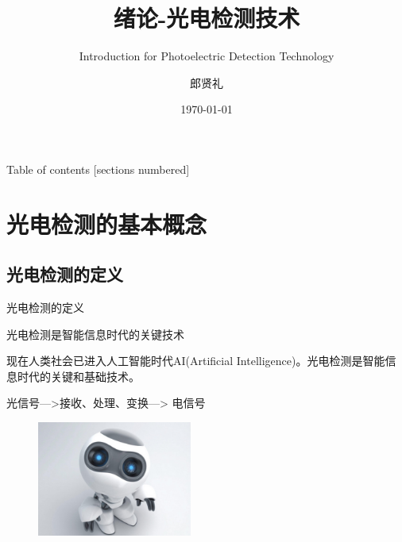 \documentclass[10pt]{beamer}
\title{绪论-光电检测技术}%
\subtitle{Introduction for Photoelectric Detection Technology}
\date{\today}
\author{郎贤礼}
\institute{仪器学院  HFUT}
\begin{document}
\maketitle

\begin{frame}{Table of contents}
  [sections numbered]
  \tableofcontents[hideallsubsections]
\end{frame}

\section{光电检测的基本概念}
\subsection{光电检测的定义}



\begin{frame}[fragile]{光电检测的定义}

  \begin{center}
  \large{光电检测是智能信息时代的关键技术}
   \end{center}
   
   现在人类社会已进入人工智能时代AI(Artificial Intelligence)。光电检测是智能信息时代的关键和基础技术。
  
  光信号--->接收、处理、变换---> 电信号\\
  \begin{figure}[htbp]
      \includegraphics[width=2.0in]{source/ai.jpeg}
  \end{figure}

  
\end{frame}

\end{document}

